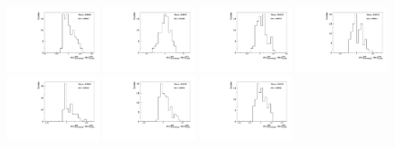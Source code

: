 \begin{figure}[h]\centering
    \includegraphics[width=0.24\textwidth]{figure/polarimetery/syst/bootstrap/output_stat_4600_delta0.pdf}
    \includegraphics[width=0.24\textwidth]{figure/polarimetery/syst/bootstrap/output_stat_4612_delta0.pdf}
    \includegraphics[width=0.24\textwidth]{figure/polarimetery/syst/bootstrap/output_stat_4626_delta0.pdf}
    \includegraphics[width=0.24\textwidth]{figure/polarimetery/syst/bootstrap/output_stat_4640_delta0.pdf}
    \includegraphics[width=0.24\textwidth]{figure/polarimetery/syst/bootstrap/output_stat_4660_delta0.pdf}
    \includegraphics[width=0.24\textwidth]{figure/polarimetery/syst/bootstrap/output_stat_4680_delta0.pdf}
    \includegraphics[width=0.24\textwidth]{figure/polarimetery/syst/bootstrap/output_stat_4700_delta0.pdf}

\end{figure}
